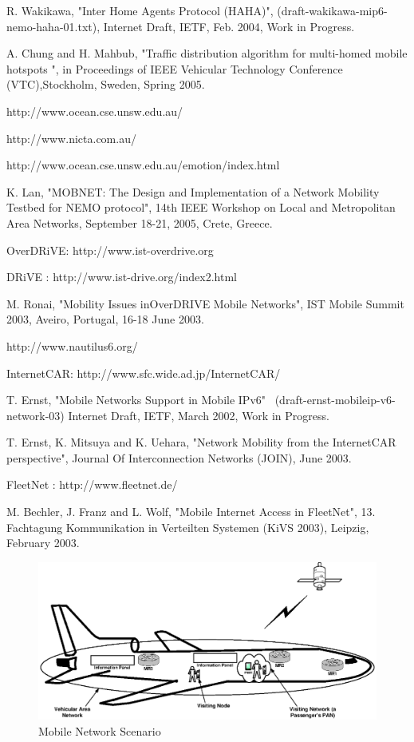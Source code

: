 \begin{thebibliography}{99}
R. Wakikawa, "Inter Home Agents Protocol (HAHA)",
(draft-wakikawa-mip6-nemo-haha-01.txt), Internet Draft, IETF, Feb.
2004, Work in Progress.

A. Chung and H. Mahbub, "Traffic distribution algorithm for
multi-homed mobile hotspots ", in Proceedings of IEEE Vehicular
Technology Conference (VTC),Stockholm, Sweden, Spring 2005.

http://www.ocean.cse.unsw.edu.au/

http://www.nicta.com.au/

http://www.ocean.cse.unsw.edu.au/emotion/index.html

K. Lan, "MOBNET: The Design and Implementation of a Network Mobility
Testbed for NEMO protocol", 14th IEEE Workshop on Local and
Metropolitan Area Networks, September 18-21, 2005, Crete, Greece.

OverDRiVE: http://www.ist-overdrive.org

DRiVE : http://www.ist-drive.org/index2.html

M. Ronai, "Mobility Issues inOverDRIVE Mobile Networks", IST Mobile
Summit 2003, Aveiro, Portugal, 16-18 June 2003.

http://www.nautilus6.org/

InternetCAR: http://www.sfc.wide.ad.jp/InternetCAR/

T. Ernst, "Mobile Networks Support in Mobile IPv6" \
(draft-ernst-mobileip-v6-network-03) Internet Draft, IETF, March
2002, Work in Progress.

T. Ernst, K. Mitsuya and K. Uehara, "Network Mobility from the
InternetCAR perspective", Journal Of Interconnection Networks
(JOIN), June 2003.

FleetNet : http://www.fleetnet.de/

M. Bechler, J. Franz and L. Wolf, "Mobile Internet Access in
FleetNet", 13. Fachtagung Kommunikation in Verteilten Systemen (KiVS
2003), Leipzig, February 2003.

\end{thebibliography}

\clearpage

\begin{figure}
    \centering
        \includegraphics{Chapter1/Fig001.eps}
    \caption{Mobile Network Scenario}
    \label{fig:Fig1}
\end{figure}

